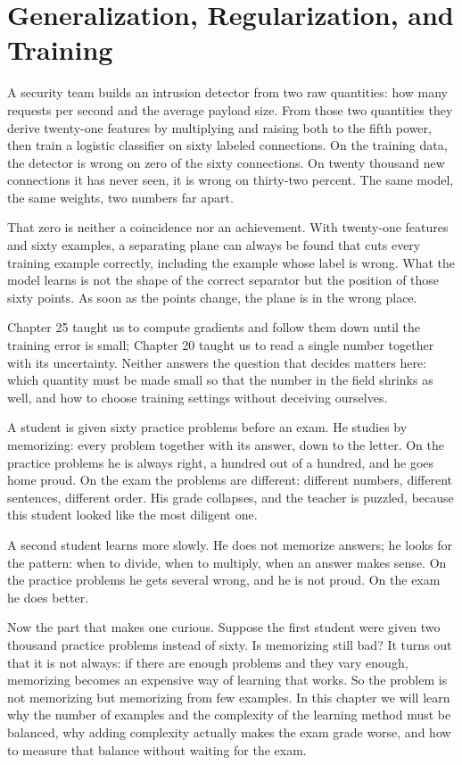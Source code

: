 \chapter{Generalization, Regularization, and Training}

A security team builds an intrusion detector from two raw quantities: how many
requests per second and the average payload size. From those two quantities they
derive twenty-one features by multiplying and raising both to the fifth power,
then train a logistic classifier on sixty labeled connections. On the training
data, the detector is wrong on zero of the sixty connections. On twenty thousand
new connections it has never seen, it is wrong on thirty-two percent. The same
model, the same weights, two numbers far apart.

That zero is neither a coincidence nor an achievement. With twenty-one features
and sixty examples, a separating plane can always be found that cuts every
training example correctly, including the example whose label is wrong. What the
model learns is not the shape of the correct separator but the position of those
sixty points. As soon as the points change, the plane is in the wrong place.

Chapter 25 taught us to compute gradients and follow them down until the training
error is small; Chapter 20 taught us to read a single number together with its
uncertainty. Neither answers the question that decides matters here: which
quantity must be made small so that the number in the field shrinks as well, and
how to choose training settings without deceiving ourselves.

\begin{untukanak}
A student is given sixty practice problems before an exam. He studies by
memorizing: every problem together with its answer, down to the letter. On the
practice problems he is always right, a hundred out of a hundred, and he goes
home proud. On the exam the problems are different: different numbers, different
sentences, different order. His grade collapses, and the teacher is puzzled,
because this student looked like the most diligent one.

A second student learns more slowly. He does not memorize answers; he looks for
the pattern: when to divide, when to multiply, when an answer makes sense. On the
practice problems he gets several wrong, and he is not proud. On the exam he does
better.

Now the part that makes one curious. Suppose the first student were given two
thousand practice problems instead of sixty. Is memorizing still bad? It turns
out that it is not always: if there are enough problems and they vary enough,
memorizing becomes an expensive way of learning that works. So the problem is not
memorizing but memorizing from few examples. In this chapter we will learn why
the number of examples and the complexity of the learning method must be
balanced, why adding complexity actually makes the exam grade worse, and how to
measure that balance without waiting for the exam.
\end{untukanak}

